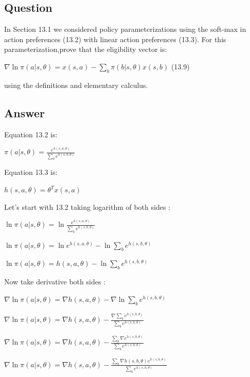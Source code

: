 \documentclass[11pt]{article}
\begin{document}
    \newpage
    \subsection{Question}

    In Section 13.1 we considered policy parameterizations using the soft-max in action preferences (13.2) with linear action preferences (13.3).
    For this parameterization,prove that the eligibility vector is:

    \hfill \break
    \noindent $ \nabla \ln \pi(a|s,\theta) = x(s,a) - \sum_{b} \pi(b|s,\theta) x(s,b)  $ \hfill (13.9)

    \hfill \break
    \noindent using the definitions and elementary calculus.

    \subsection*{Answer}

    \noindent Equation 13.2 is:

    \noindent $ \pi(a|s,\theta) = \frac{e^{h(s,a,\theta)}}{\sum_{b} e^{h(s,b,\theta)}} $

    \hfill \break
    \noindent Equation 13.3 is:

    \noindent $ h(s,a,\theta) = \theta^T x(s,a) $

    \hfill \break
    \noindent Let's start with 13.2 taking logarithm of both sides :

     \noindent $ \ln \pi(a|s,\theta) = \ln \frac{e^{h(s,a,\theta)}}{\sum_{b} e^{h(s,b,\theta)}} $

    \noindent $ \ln \pi(a|s,\theta) =  \ln  e^{h(s,a,\theta)} - \ln \sum_{b} e^{h(s,b,\theta)} $

    \noindent $ \ln \pi(a|s,\theta) =  h(s,a,\theta)  - \ln \sum_{b} e^{h(s,b,\theta)} $

     \hfill \break
    \noindent Now take derivative both sides :

     \noindent $ \nabla \ln \pi(a|s,\theta) =  \nabla h(s,a,\theta)  - \nabla  \ln \sum_{b} e^{h(s,b,\theta)} $

    \noindent $ \nabla \ln \pi(a|s,\theta) =  \nabla h(s,a,\theta)  -  \frac{\nabla  \sum_{b} e^{h(s,b,\theta)}}{\sum_{b} e^{h(s,b,\theta)}}  $

    \noindent $ \nabla \ln \pi(a|s,\theta) =  \nabla h(s,a,\theta)  -  \frac{  \sum_{b} \nabla e^{h(s,b,\theta)}}{\sum_{b} e^{h(s,b,\theta)}}  $

    \noindent $ \nabla \ln \pi(a|s,\theta) =  \nabla h(s,a,\theta)  -  \frac{  \sum_{b} \nabla h(s,b,\theta) e^{h(s,b,\theta)}}{\sum_{b} e^{h(s,b,\theta)}}  $
\end{document}
